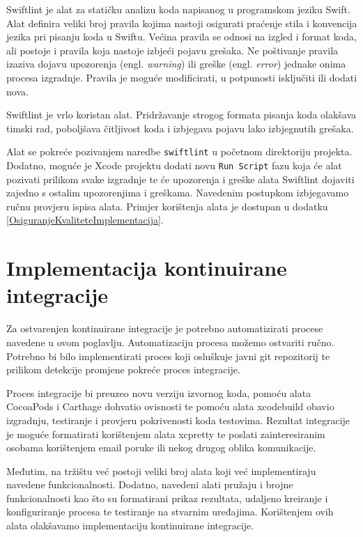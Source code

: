 \documentclass[times, utf8, diplomski, numeric]{fer}
\newcommand{\eng}[1]{(engl. \textit{#1})}
\begin{document}
Swiftlint je alat za statičku analizu koda napisanog u programskom jeziku Swift. Alat definira veliki broj pravila kojima nastoji osigurati praćenje stila i konvencija jezika pri pisanju koda u Swiftu\citep{SwiftLint}. Većina pravila se odnosi na izgled i format koda, ali postoje i pravila koja nastoje izbjeći pojavu grešaka. Ne poštivanje pravila izaziva dojavu upozorenja \eng{warning} ili greške \eng{error} jednake onima procesa izgradnje. Pravila je moguće modificirati, u potpunosti isključiti ili dodati nova.

Swiftlint je vrlo koristan alat. Pridržavanje strogog formata pisanja koda olakšava timski rad, poboljšava čitljivost koda i izbjegava pojavu lako izbjegnutih grešaka.

Alat se pokreće pozivanjem naredbe \verb|swiftlint| u početnom direktoriju projekta. Dodatno, moguće je Xcode projektu dodati novu \verb|Run Script| fazu koja će alat pozivati prilikom svake izgradnje te će upozorenja i greške alata Swiftlint dojaviti zajedno s ostalim upozorenjima i greškama. Navedenim postupkom izbjegavamo ručnu provjeru ispisa alata. Primjer korištenja alata je dostupan u dodatku \ref{OsiguranjeKvaliteteImplementacija}.


\section{Implementacija kontinuirane integracije} \label{XcodeServerCI}

Za ostvarenjen kontinuirane integracije je potrebno automatizirati procese navedene u ovom poglavlju. Automatizaciju procesa možemo ostvariti ručno. Potrebno bi bilo implementirati proces koji osluškuje javni git repozitorij te prilikom detekcije promjene pokreće proces integracije.

Proces integracije bi preuzeo novu verziju izvornog koda, pomoću alata CocoaPods i Carthage dohvatio ovisnosti te pomoću alata xcodebuild obavio izgradnju, testiranje i provjeru pokrivenosti koda testovima. Rezultat integracije je moguće formatirati korištenjem alata xcpretty te poslati zainteresiranim osobama korištenjem email poruke ili nekog drugog oblika komunikacije.

Međutim, na tržištu već postoji veliki broj alata koji već implementiraju navedene funkcionalnosti. Dodatno, navedeni alati pružaju i brojne funkcionalnosti kao što su formatirani prikaz rezultata, udaljeno kreiranje i konfiguriranje procesa te testiranje na stvarnim uređajima. Korištenjem ovih alata olakšavamo implementaciju kontinuirane integracije.
\end{document}
